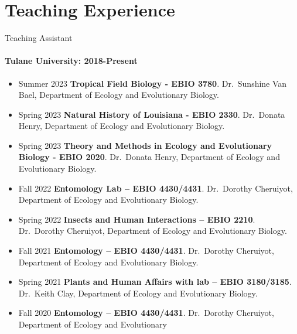 \documentclass[11pt,a4paper,]{awesome-cv}
\begin{document}
\hypertarget{teaching-experience}{%
\section{\texorpdfstring{ Teaching
Experience}{ Teaching Experience}}\label{teaching-experience}}

Teaching Assistant

\hypertarget{tulane-university-2018-present}{%
\paragraph{Tulane University:
2018-Present}\label{tulane-university-2018-present}}

\begin{itemize}
\item
  Summer 2023 \textbar{} \textbf{Tropical Field Biology - EBIO 3780}.
  Dr.~Sunshine Van Bael, Department of Ecology and Evolutionary
  Biology.\\
\item
  Spring 2023 \textbar{} \textbf{Natural History of Louisiana - EBIO
  2330}. Dr.~Donata Henry, Department of Ecology and Evolutionary
  Biology.\\
\item
  Spring 2023 \textbar{} \textbf{Theory and Methods in Ecology and
  Evolutionary Biology - EBIO 2020}. Dr.~Donata Henry, Department of
  Ecology and Evolutionary Biology.\\
\item
  Fall 2022 \textbar{} \textbf{Entomology Lab -- EBIO 4430/4431}.
  Dr.~Dorothy Cheruiyot, Department of Ecology and Evolutionary
  Biology.\\
\item
  Spring 2022 \textbar{} \textbf{Insects and Human Interactions -- EBIO
  2210}. Dr.~Dorothy Cheruiyot, Department of Ecology and Evolutionary
  Biology.\\
\item
  Fall 2021 \textbar{} \textbf{Entomology -- EBIO 4430/4431}.
  Dr.~Dorothy Cheruiyot, Department of Ecology and Evolutionary
  Biology.\\
\item
  Spring 2021 \textbar{} \textbf{Plants and Human Affairs with lab --
  EBIO 3180/3185}. Dr.~Keith Clay, Department of Ecology and
  Evolutionary Biology.\\
\item
  Fall 2020 \textbar{} \textbf{Entomology -- EBIO 4430/4431}.
  Dr.~Dorothy Cheruiyot, Department of Ecology and Evolutionary

\end{itemize}
\end{document}
